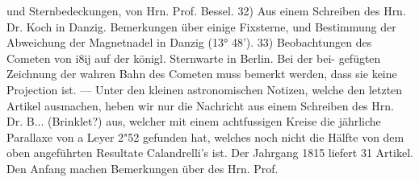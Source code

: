 \documentclass[12pt,a4paper]{article}
\begin{document}
und Sternbedeckungen, von Hrn. Prof. Bessel. 32) Aus einem Schreiben des Hrn. Dr. Koch in Danzig.\newline
Bemerkungen über einige Fixsterne, und Bestimmung der Abweichung der Magnetnadel in Danzig\newline
(13° 48'). 33) Beobachtungen des Cometen von i8ij auf der königl. Sternwarte in Berlin. Bei der bei-\newline
gefügten Zeichnung der wahren Bahn des Cometen muss bemerkt werden, dass sie keine Projection ist. ---\newline
Unter den kleinen astronomischen Notizen, welche den letzten Artikel ausmachen, heben wir nur die\newline
Nachricht aus einem Schreiben des Hrn. Dr. B... (Brinklet?) aus, welcher mit einem achtfussigen\newline
Kreise die jährliche Parallaxe von a Leyer 2"52 gefunden hat, welches noch nicht die Hälfte von dem\newline
oben angeführten Resultate Calandrelli's ist.\newline
Der Jahrgang 1815 liefert 31 Artikel. Den Anfang machen Bemerkungen über des Hrn. Prof.\newline
\end{document}
